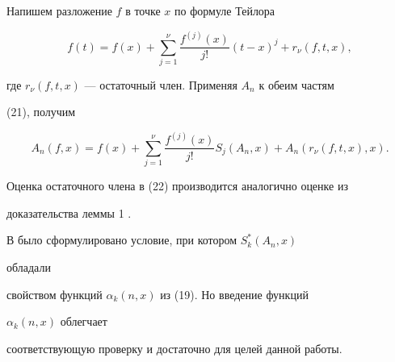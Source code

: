  


\begin{pf} 


Напишем разложение $f$ в точке $x$ по формуле Тейлора 


\begin{equation} 


f(t)=f(x)+\sum^\nu_{j=1}\frac{f^{(j)}(x)}{j!} 


(t-x)^j+r_\nu(f,t,x), 


\end{equation} 


где $r_\nu(f,t,x)$ --- остаточный член. Применяя $A_n$ к обеим частям 


(21), получим 


\begin{equation} 


A_n(f,x)=f(x)+\sum^\nu_{j=1}\frac{f^{(j)}(x)}{j!} 


S_j(A_n,x)+A_n(r_\nu(f,t,x),x). 


\end{equation} 


Оценка остаточного члена в (22) производится аналогично оценке из 


доказательства леммы 1 \cite{7}.


\end{pf} 


 


\begin{note} 


В \cite{7} было сформулировано условие, при котором $S^*_k(A_n,x)$ 


обладали 


свойством функций $\alpha_k(n,x)$ из (19). Но введение функций 


$\alpha_k(n,x)$ облегчает 


соответствующую проверку и достаточно для целей данной работы. 


\end{note} 


 



